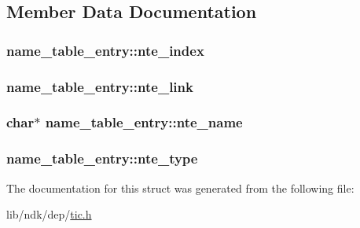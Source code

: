 \subsection{Member Data Documentation}
\hypertarget{structname__table__entry_aafb4b3f2a851f29d70b975e268fbec22}{
\subsubsection[{nte\-\_\-index}]{ name\-\_\-table\-\_\-entry\-::nte\-\_\-index}}\label{structname__table__entry_aafb4b3f2a851f29d70b975e268fbec22}
\hypertarget{structname__table__entry_afd9aef695fb85dd7de2bd7d0390c0af8}{
\subsubsection[{nte\-\_\-link}]{ name\-\_\-table\-\_\-entry\-::nte\-\_\-link}}\label{structname__table__entry_afd9aef695fb85dd7de2bd7d0390c0af8}
\hypertarget{structname__table__entry_a0972321622fb9e4d8807f5bd6de99e43}{
\subsubsection[{nte\-\_\-name}]{ char$\ast$ name\-\_\-table\-\_\-entry\-::nte\-\_\-name}}\label{structname__table__entry_a0972321622fb9e4d8807f5bd6de99e43}
\hypertarget{structname__table__entry_a28f0c39889aef0dd78cfe96bb8d83d2f}{
\subsubsection[{nte\-\_\-type}]{ name\-\_\-table\-\_\-entry\-::nte\-\_\-type}}\label{structname__table__entry_a28f0c39889aef0dd78cfe96bb8d83d2f}


The documentation for this struct was generated from the following file\-:\begin{DoxyCompactItemize}
\item 
lib/ndk/dep/\hyperlink{tic_8h}{tic.\-h}\end{DoxyCompactItemize}
